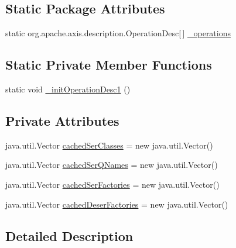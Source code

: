 \subsection*{Static Package Attributes}
\begin{DoxyCompactItemize}
\item 
static org.apache.axis.description.OperationDesc\mbox{[}$\,$\mbox{]} \hyperlink{classorg_1_1glite_1_1security_1_1voms_1_1service_1_1certificates_1_1VOMSCertificatesSoapBindingStub_ab3111b5cf47855fe95aa496610062dbe}{\_\-operations}
\end{DoxyCompactItemize}
\subsection*{Static Private Member Functions}
\begin{DoxyCompactItemize}
\item 
static void \hyperlink{classorg_1_1glite_1_1security_1_1voms_1_1service_1_1certificates_1_1VOMSCertificatesSoapBindingStub_a225966a46f6641c7c509384a29d7bcbb}{\_\-initOperationDesc1} ()
\end{DoxyCompactItemize}
\subsection*{Private Attributes}
\begin{DoxyCompactItemize}
\item 
java.util.Vector \hyperlink{classorg_1_1glite_1_1security_1_1voms_1_1service_1_1certificates_1_1VOMSCertificatesSoapBindingStub_ae2308f8f6cf96c5cf5b9ac0c854d9114}{cachedSerClasses} = new java.util.Vector()
\item 
java.util.Vector \hyperlink{classorg_1_1glite_1_1security_1_1voms_1_1service_1_1certificates_1_1VOMSCertificatesSoapBindingStub_a63bdef3d7a3488e55c1900ac491e79a5}{cachedSerQNames} = new java.util.Vector()
\item 
java.util.Vector \hyperlink{classorg_1_1glite_1_1security_1_1voms_1_1service_1_1certificates_1_1VOMSCertificatesSoapBindingStub_a66a5fa754279379d65f71345bce521a5}{cachedSerFactories} = new java.util.Vector()
\item 
java.util.Vector \hyperlink{classorg_1_1glite_1_1security_1_1voms_1_1service_1_1certificates_1_1VOMSCertificatesSoapBindingStub_a3ee5954225532892b4843477390b55d4}{cachedDeserFactories} = new java.util.Vector()
\end{DoxyCompactItemize}


\subsection{Detailed Description}


